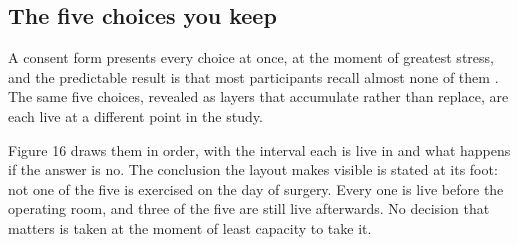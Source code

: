\vspace{-0.7cm}

\subsection{The five choices you keep}

A consent form presents every choice at once, at the moment of greatest stress,
and the predictable result is that most participants recall almost none of them
\cite{NCIConsent24, cfr050paiuni}. The same five choices, revealed as layers that
accumulate rather than replace, are each live at a different point in the study.

Figure 16 draws them in order, with the interval each is live in and what
happens if the answer is no. The conclusion the layout makes visible is stated
at its foot: not one of the five is exercised on the day of surgery. Every one
is live before the operating room, and three of the five are still live
afterwards. No decision that matters is taken at the moment of least capacity to
take it.

